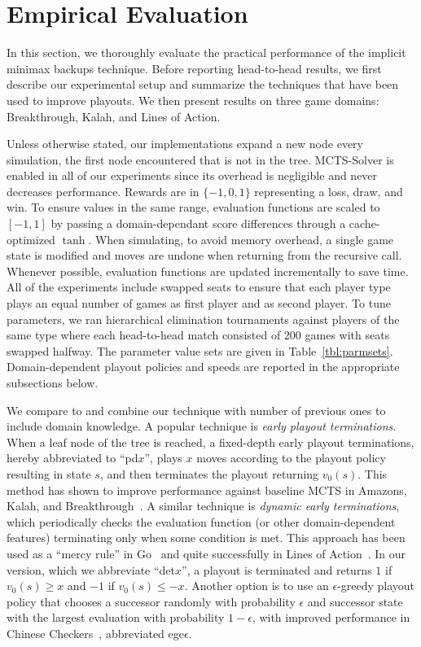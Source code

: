 \documentclass[letterpaper]{article}
\begin{document}
\section{Empirical Evaluation}

\newcommand{\UCTMAXH}{$\mbox{UCTMAX}_H$\xspace}
\newcommand{\UCTH}{$\mbox{UCT}_H$\xspace}

In this section, we thoroughly evaluate the practical performance of the implicit minimax backups technique. 
Before reporting head-to-head results, we first describe our experimental setup and 
summarize the techniques that have been used to improve playouts. We then present results on three game
domains: Breakthrough, Kalah, and Lines of Action. 

Unless otherwise stated, our implementations expand a new node every simulation, the first node encountered
that is not in the tree. MCTS-Solver is enabled in all of our experiments since its overhead is negligible and
never decreases performance. 
Rewards are in $\{-1, 0, 1\}$ representing a loss, draw, and win.
To ensure values in the same range, evaluation functions are scaled to $[-1,1]$ by passing a domain-dependant 
score differences through a cache-optimized $\tanh$. 
When simulating, to avoid memory overhead, a single game state is modified and 
moves are undone when returning from the recursive call.
Whenever possible, evaluation functions are updated incrementally to save time. 
All of the experiments include swapped seats to ensure that each player type plays 
an equal number of games as first player and as second player. 
To tune parameters, we ran hierarchical elimination tournaments against players of the same type where each 
head-to-head match consisted of 200 games with seats swapped halfway. The parameter value sets are 
given in Table~\ref{tbl:parmsets}. 
Domain-dependent playout policies and speeds are reported in the appropriate subsections below.


We compare to and combine our technique with number of previous ones to include  
domain knowledge. A popular technique is {\it early playout terminations}. When a leaf node of the tree 
is reached, a fixed-depth early playout terminations, hereby abbreviated to ``pd$x$'', plays $x$ moves according
to the playout policy resulting in state $s$, and then terminates the playout returning $v_0(s)$. This method has
shown to improve performance against baseline MCTS in Amazons, Kalah, and 
Breakthrough~\cite{Lorentz08Amazons,RamanujanS11,Lorentz13Breakthrough}. A similar technique is 
{\it dynamic early terminations}, which periodically checks the evaluation function (or other domain-dependent features)
terminating only when some condition is met. 
This approach has been used as a ``mercy rule'' in Go~\cite{Bouzy07Old} and quite successfully in 
Lines of Action~\cite{Winands08MCTSSolver}.
In our version, which we abbreviate ``det$x$'', a playout is terminated and returns $1$ if $v_0(s) \ge x$ and 
$-1$ if $v_0(s) \le -x$. Another option is to use an $\epsilon$-greedy playout policy that chooses a successor randomly 
with probability $\epsilon$ and successor state with the largest evaluation with probability $1-\epsilon$, with 
improved performance in Chinese Checkers~\cite{Sturtevant08An,Nijssen12Playout}, abbreviated ege$\epsilon$.
\end{document}
